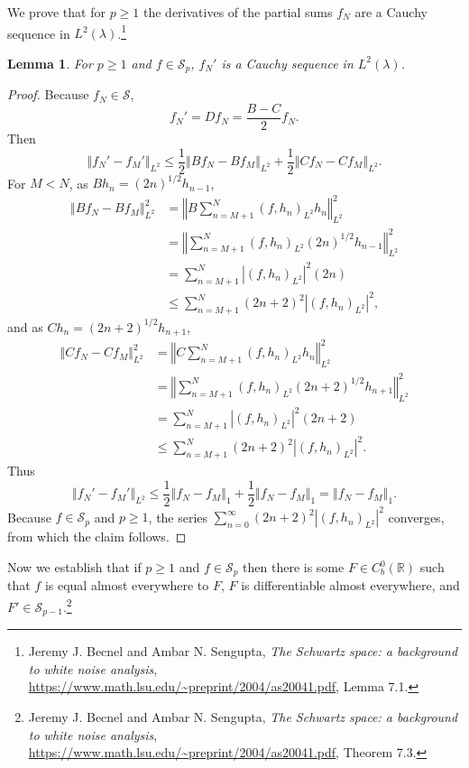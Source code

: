 \documentclass{article}
\newcommand{\norm}[1]{\left\Vert #1 \right\Vert}
\newtheorem{lemma}[theorem]{Lemma}
\theoremstyle{definition}
\begin{document}
We prove that for $p \geq 1$ the derivatives of the partial sums $f_N$ are a Cauchy sequence
in $L^2(\lambda)$.\footnote{Jeremy J. Becnel and Ambar N. Sengupta,
{\em The Schwartz space: a background to white noise analysis},
\url{https://www.math.lsu.edu/~preprint/2004/as20041.pdf}, Lemma 7.1.}

\begin{lemma}
For $p \geq 1$ and $f \in \mathscr{S}_p$, $f_N'$ is a Cauchy sequence in $L^2(\lambda)$.
\label{cauchyL2}
\end{lemma}
\begin{proof}
Because $f_N \in \mathscr{S}$,
\[
f_N' =Df_N= \frac{B-C}{2}f_N.
\]
Then
\[
\norm{f_N'-f_M'}_{L^2} \leq \frac{1}{2}\norm{Bf_N-Bf_M}_{L^2} + \frac{1}{2}\norm{Cf_N-Cf_M}_{L^2}.
\]
For $M<N$, as $Bh_n=(2n)^{1/2}h_{n-1}$,
\begin{align*}
\norm{Bf_N-Bf_M}_{L^2}^2&=\norm{B \sum_{n=M+1}^N (f,h_n)_{L^2} h_n}_{L^2}^2\\
&=\norm{ \sum_{n=M+1}^N (f,h_n)_{L^2} (2n)^{1/2} h_{n-1}}_{L^2}^2\\
&=\sum_{n=M+1}^N |(f,h_n)_{L^2}|^2 (2n)\\
&\leq \sum_{n=M+1}^N (2n+2)^2 |(f,h_n)_{L^2}|^2,
\end{align*}
and as $Ch_n=(2n+2)^{1/2}h_{n+1}$,
\begin{align*}
\norm{Cf_N-Cf_M}_{L^2}^2&=\norm{C \sum_{n=M+1}^N (f,h_n)_{L^2} h_n}_{L^2}^2\\
&=\norm{ \sum_{n=M+1}^N (f,h_n)_{L^2}(2n+2)^{1/2}h_{n+1}}_{L^2}^2\\
&=\sum_{n=M+1}^N |(f,h_n)_{L^2}|^2 (2n+2)\\
&\leq \sum_{n=M+1}^N (2n+2)^2 |(f,h_n)_{L^2}|^2.
\end{align*}
Thus
\[
\norm{f_N'-f_M'}_{L^2} \leq \frac{1}{2}\norm{f_N-f_M}_1 +  \frac{1}{2}\norm{f_N-f_M}_1
= \norm{f_N-f_M}_1.
\]
Because $f \in \mathscr{S}_p$ and $p \geq 1$, 
the series $\sum_{n=0}^\infty (2n+2)^2 |(f,h_n)_{L^2}|^2$ converges, from
which the claim follows.
\end{proof}



Now we establish that if
$p \geq 1$ and $f \in \mathscr{S}_p$ then there is some $F \in C_b^0(\mathbb{R})$ such that $f$ is equal almost everywhere to $F$,
$F$ is differentiable almost everywhere,
and $F'  \in \mathscr{S}_{p-1}$.\footnote{Jeremy J. Becnel and Ambar N. Sengupta,
{\em The Schwartz space: a background to white noise analysis},
\url{https://www.math.lsu.edu/~preprint/2004/as20041.pdf}, Theorem 7.3.}
\end{document}
